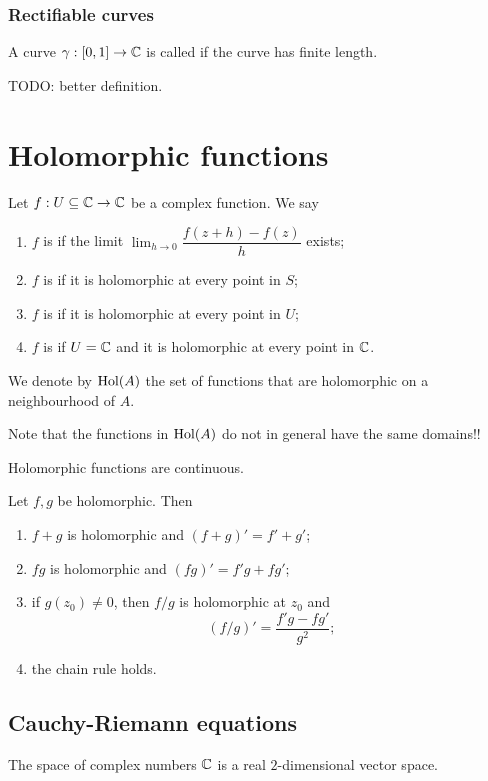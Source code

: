 \subsubsection{Rectifiable curves}
\begin{definition}
A curve $\gamma: \interval{0,1}\to \C$ is called  if the curve has finite length.
\end{definition}
TODO: better definition.


\section{Holomorphic functions}
\begin{definition}
Let $f:U\subseteq \mathbb{C} \to \mathbb{C}$ be a complex function. We say
\begin{enumerate}
\item $f$ is  if the limit $\lim_{h\to 0} \dfrac{f(z+h) - f(z)}{h}$
exists;
\item $f$ is  if it is holomorphic at every point in $S$;
\item $f$ is  if it is holomorphic at every point in $U$;
\item $f$ is  if $U=\mathbb{C}$ and it is holomorphic at every point in $\mathbb{C}$.
\end{enumerate}
We denote by $\operatorname{Hol}(A)$ the set of functions that are holomorphic on a neighbourhood of $A$.
\end{definition}
Note that the functions in $\operatorname{Hol}(A)$ do not in general have the same domains!!

\begin{lemma}
Holomorphic functions are continuous.
\end{lemma}
\begin{lemma}
Let $f,g$ be holomorphic. Then
\begin{enumerate}
\item $f+g$ is holomorphic and $(f+g)' = f'+g'$;
\item $fg$ is holomorphic and $(fg)' = f'g+fg'$;
\item if $g(z_0)\neq 0$, then $f/g$ is holomorphic at $z_0$ and
\[ (f/g)' = \frac{f'g - fg'}{g^2}; \]
\item the chain rule holds.
\end{enumerate}
\end{lemma}

\subsection{Cauchy-Riemann equations}
The space of complex numbers $\mathbb{C}$ is a real $2$-dimensional vector space.

